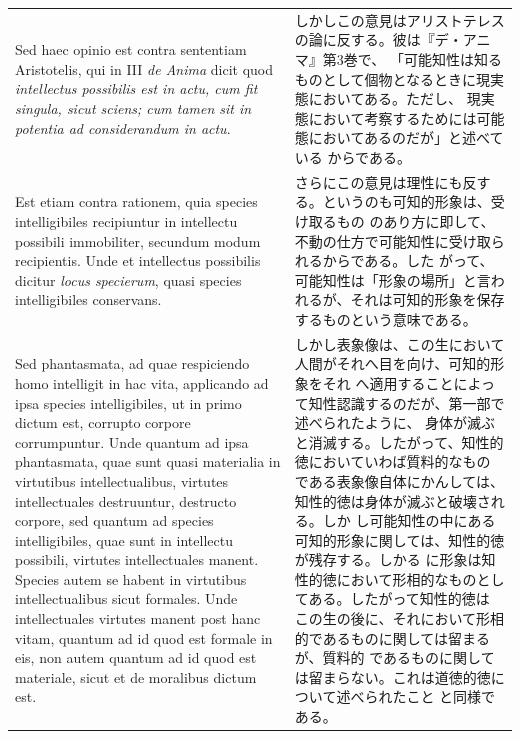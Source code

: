 \documentclass[paper=a4paper,fontsize=10pt,jafontsize=9pt,titlepage]{jlreq}
\begin{document}
\begin{longtable}{p{21em}p{21em}}
\\


 Sed haec opinio est contra sententiam Aristotelis, qui in III
 {\itshape de Anima} dicit quod {\itshape intellectus possibilis est
 in actu, cum fit singula, sicut sciens; cum tamen sit in potentia ad
 considerandum in actu}. 

&

 しかしこの意見はアリストテレスの論に反する。彼は『デ・アニマ』第3巻で、
 「可能知性は知るものとして個物となるときに現実態においてある。ただし、
 現実態において考察するためには可能態においてあるのだが」と述べている
 からである。

\\

Est etiam contra rationem, quia species intelligibiles recipiuntur in
 intellectu possibili immobiliter, secundum modum recipientis. Unde et
 intellectus possibilis dicitur {\itshape locus specierum}, quasi
 species intelligibiles conservans.

 &

 さらにこの意見は理性にも反する。というのも可知的形象は、受け取るもの
 のあり方に即して、不動の仕方で可能知性に受け取られるからである。した
 がって、可能知性は「形象の場所」と言われるが、それは可知的形象を保存
 するものという意味である。

 
 \\
 

 Sed phantasmata, ad quae respiciendo homo intelligit in hac vita,
 applicando ad ipsa species intelligibiles, ut in primo dictum est,
 corrupto corpore corrumpuntur. Unde quantum ad ipsa phantasmata, quae
 sunt quasi materialia in virtutibus intellectualibus, virtutes
 intellectuales destruuntur, destructo corpore, sed quantum ad species
 intelligibiles, quae sunt in intellectu possibili, virtutes
 intellectuales manent. Species autem se habent in virtutibus
 intellectualibus sicut formales. Unde intellectuales virtutes manent
 post hanc vitam, quantum ad id quod est formale in eis, non autem
 quantum ad id quod est materiale, sicut et de moralibus dictum est.

 
&

 しかし表象像は、この生において人間がそれへ目を向け、可知的形象をそれ
 へ適用することによって知性認識するのだが、第一部で述べられたように、
 身体が滅ぶと消滅する。したがって、知性的徳においていわば質料的なもの
 である表象像自体にかんしては、知性的徳は身体が滅ぶと破壊される。しか
 し可能知性の中にある可知的形象に関しては、知性的徳が残存する。しかる
 に形象は知性的徳において形相的なものとしてある。したがって知性的徳は
 この生の後に、それにおいて形相的であるものに関しては留まるが、質料的
 であるものに関しては留まらない。これは道徳的徳について述べられたこと
 と同様である。


\end{longtable}
\end{document}
